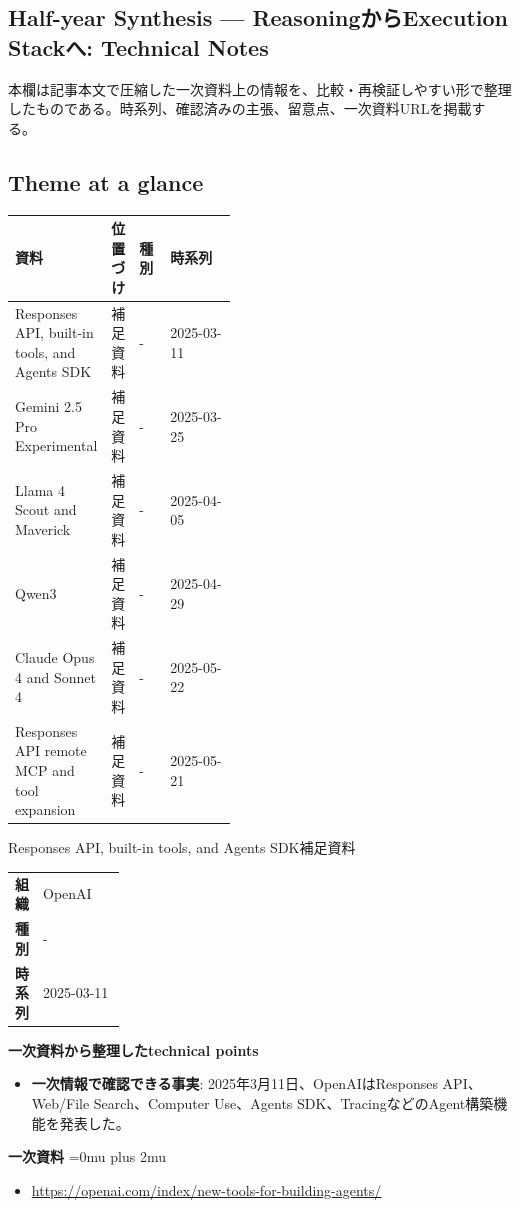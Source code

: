 \subsection*{Half-year Synthesis — ReasoningからExecution Stackへ: Technical Notes}
本欄は記事本文で圧縮した一次資料上の情報を、比較・再検証しやすい形で整理したものである。時系列、確認済みの主張、留意点、一次資料URLを掲載する。
\medskip
\subsection*{Theme at a glance}
\begin{center}
\footnotesize
\begin{tabularx}{\linewidth}{@{}p{0.20\linewidth}p{0.10\linewidth}p{0.14\linewidth}X@{}}
\toprule
資料 & 位置づけ & 種別 & 時系列 \\
\midrule
Responses API, built-in tools, and Agents SDK & 補足資料 & - & 2025-03-11   \\
Gemini 2.5 Pro Experimental & 補足資料 & - & 2025-03-25   \\
Llama 4 Scout and Maverick & 補足資料 & - & 2025-04-05   \\
Qwen3 & 補足資料 & - & 2025-04-29   \\
Claude Opus 4 and Sonnet 4 & 補足資料 & - & 2025-05-22   \\
Responses API remote MCP and tool expansion & 補足資料 & - & 2025-05-21   \\
\bottomrule
\end{tabularx}
\end{center}
\normalsize

\begin{technicalnote}{Responses API, built-in tools, and Agents SDK}{補足資料}
\begingroup
\begin{tabularx}{\linewidth}{@{}>{\bfseries}p{0.22\linewidth}X@{}}
組織 & OpenAI \\
種別 & - \\
時系列 & 2025-03-11 \\
\end{tabularx}
\smallskip
{\bfseries 一次資料から整理したtechnical points}
\begin{itemize}[leftmargin=1.5em,itemsep=0.35em]
\item \textbf{一次情報で確認できる事実}: 2025年3月11日、OpenAIはResponses API、Web/File Search、Computer Use、Agents SDK、TracingなどのAgent構築機能を発表した。
\end{itemize}
\begin{samepage}
{\bfseries 一次資料}
\begingroup\sloppy
\Urlmuskip=0mu plus 2mu\relax
\begin{itemize}[leftmargin=1.5em,itemsep=0.25em]
\item {\scriptsize\url{https://openai.com/index/new-tools-for-building-agents/}}
\end{itemize}
\endgroup
\end{samepage}
\endgroup
\end{technicalnote}
\medskip

